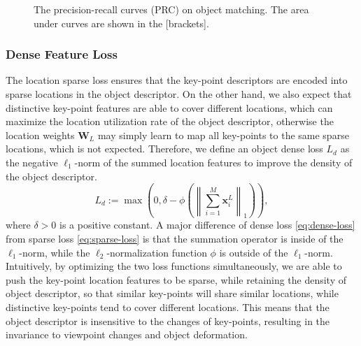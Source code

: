 \documentclass[letterpaper, 10 pt, journal, twoside]{IEEEtran}  %
\newcommand{\fix}[1]{#1}
\begin{document}
\begin{figure*}[!t]
    \centering
    \hfil
    \hfil
    \caption{The precision-recall curves (PRC) on object matching. The area under curves are shown in the [brackets].}
    \label{fig:tracking}
\end{figure*}

\subsubsection{Dense Feature Loss} \label{sec:dense-loss}

The location sparse loss ensures that the key-point descriptors are encoded into sparse locations in the object descriptor. On the other hand, we also expect that distinctive key-point features are able to cover different locations, which can maximize the location utilization rate of the object descriptor, otherwise the location weights $\mathbf{W}_L$ \fix{may} simply learn to map all key-points to the same sparse locations, which is not expected.
Therefore, we define an object dense loss $L_d$ as the negative $\ell_1$-norm of the summed location features to improve the density of the object descriptor.
\begin{equation}\label{eq:dense-loss}
    L_d := \max \left(0, \delta- \phi\left( \left\|\sum^{M}_{i=1} \mathbf{x}_i^L \right\|_1\right)\right),
\end{equation}
where $\delta>0$ is a positive constant. A major difference of dense loss \eqref{eq:dense-loss} from sparse loss \eqref{eq:sparse-loss} is that the summation operator is inside of the $\ell_1$-norm, while the $\ell_2$-normalization function $\phi$ is outside of the $\ell_1$-norm.
Intuitively, by optimizing the two loss functions simultaneously, we are able to push the key-point location features to be sparse, while retaining the density of object descriptor, so that similar key-points will share similar locations, while distinctive key-points tend to cover different locations.
This means that the object descriptor is insensitive to the changes of key-points, resulting in the invariance to viewpoint changes and object deformation.
\end{document}
